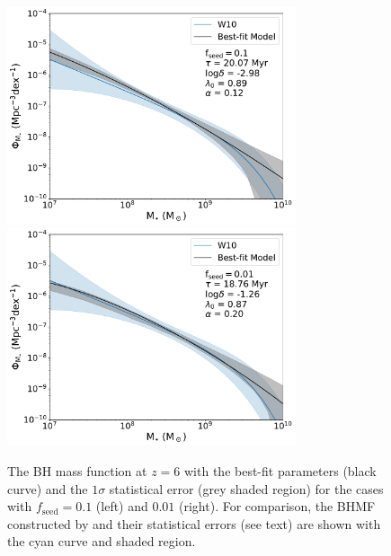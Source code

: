 \documentclass[twocolumn, twocolappendix]{aastex63}
\newcommand{\fseed}{f_\mathrm{seed}}
\begin{document}
\begin{CJK*}{UTF8}{gbsn}
\begin{figure}
\centering
\includegraphics[width=85mm]{f1ndraw60MF_spread.pdf}\hspace{3mm}
\includegraphics[width=85mm]{f2ndraw60MF_spread.pdf}
\caption{
The BH mass function at $z=6$ with the best-fit parameters (black curve) and the $1\sigma$ statistical error (grey shaded region) 
for the cases with $\fseed=0.1$ (left) and $0.01$ (right). 
For comparison, the BHMF constructed by  and their statistical errors (see text) are shown with the cyan curve and shaded region.
}
\label{fig:fitmf}
\vspace{2mm}
\end{figure}



\end{CJK*}
\end{document}
